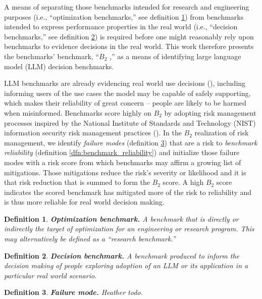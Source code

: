 \documentclass{article}
\newtheorem{dfn}{Definition}[section]
\newcommand\bb{$B_2$ }
\begin{document}
A means of separating those benchmarks intended for research and engineering purposes (i.e., ``optimization benchmarks,'' see definition \ref{dfn:optimization_benchmark}) from benchmarks intended to express performance properties in the real world (i.e., ``decision benchmarks,'' see definition \ref{dfn:decision_benchmark}) is required before one might reasonably rely upon benchmarks to evidence decisions in the real world. This work therefore presents the benchmarks' benchmark, ``\bb,'' as a means of identifying large language model (LLM) decision benchmarks.

LLM benchmarks are already evidencing real world use decisions (\cite{rottger2024safetyprompts,bommasani2024foundation}), including informing users of the use cases the model may be capable of safely supporting, which makes their reliability of great concern -- people are likely to be harmed when misinformed. Benchmarks score highly on \bb by adopting risk management processes inspired by the National Institute of Standards and Technology (NIST) information security risk management practices (\cite{nist80030r1}). In the \bb realization of risk management, we identify \textit{failure modes} (definition \ref{dfn:failure_mode}) that are a risk to \textit{benchmark reliability} (definition \ref{dfn:benchmark_reliability}) and initialize those failure modes with a risk score from which benchmarks may affirm a growing list of mitigations. Those mitigations reduce the risk's severity or likelihood and it is that risk reduction that is summed to form the \bb score. A high \bb score indicates the scored benchmark has mitigated more of the risk to reliability and is thus more reliable for real world decision making.

\begin{dfn}
\label{dfn:optimization_benchmark}
{\bf Optimization benchmark.} A benchmark that is directly or indirectly the target of optimization for an engineering or research program. This may alternatively be defined as a ``research benchmark.''
\end{dfn}

\begin{dfn}
\label{dfn:decision_benchmark}
{\bf Decision benchmark.} A benchmark produced to inform the decision making of people exploring adoption of an LLM or its application in a particular real world scenario.
\end{dfn}

\begin{dfn}
\label{dfn:failure_mode}
{\bf Failure mode.} Heather todo.
\end{dfn}
\end{document}
